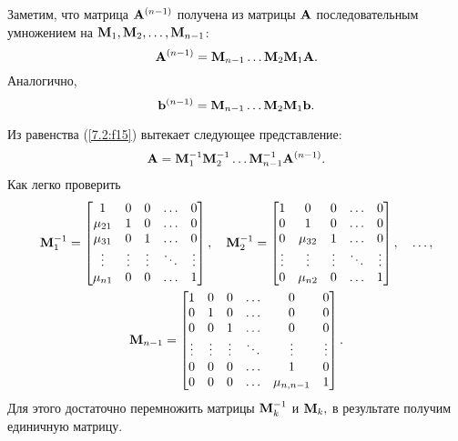 \documentclass[12pt]{article}
\begin{document}
    Заметим, что матрица $\bold{A}^{\left(n-1\right)}$ получена из матрицы $\bold{A}$ последовательным умножением на $\bold{M}_1, \bold{M}_2, \ldots, \bold{M}_{n-1}$:
    \begin{equation}
        \bold{A}^{\left(n-1\right)}=\bold{M}_{n-1}\ldots\bold{M}_2\bold{M}_1\bold{A}.
        \label{7.2:f15}
    \end{equation}
    Аналогично,
    \begin{equation}
        \bold{b}^{\left(n-1\right)}=\bold{M}_{n-1}\ldots\bold{M}_2\bold{M}_1\bold{b}.
    \end{equation}

    Из равенства (\ref{7.2:f15}) вытекает следующее представление:
    \begin{equation}
        \bold{A} = \bold{M}_1^{-1}\bold{M}_2^{-1}\ldots\bold{M}_{n-1}^{-1}\bold{A}^{\left(n-1\right)}.
        \label{7.2:f17}
    \end{equation}
    Как легко проверить
    \begin{equation}
        \begin{gathered}
            \bold{M}_1^{-1}=\begin{bmatrix}
                1 & 0 & 0 & \ldots & 0 \\
                \mu_{21} & 1 & 0 & \ldots & 0 \\
                \mu_{31} & 0 & 1 & \ldots & 0 \\
                \vdots & \vdots & \vdots & \ddots & \vdots \\
                \mu_{n1} & 0 & 0 & \ldots & 1
            \end{bmatrix},\quad
            \bold{M}_2^{-1}=
            \begin{bmatrix}
                1 & 0 & 0 & \ldots & 0 \\
                0 & 1 & 0 & \ldots & 0 \\
                0 & \mu_{32} & 1 & \ldots & 0 \\
                 \vdots & \vdots & \vdots & \ddots & \vdots \\
                 0 & \mu_{n2} & 0 & \ldots & 1
            \end{bmatrix},\quad\ldots,\\
            \bold{M}_{n-1}=
            \begin{bmatrix}
                1 & 0 & 0 & \ldots & 0 & 0 \\
                0 & 1 & 0 & \ldots & 0 & 0 \\
                0 & 0 & 1 & \ldots & 0 & 0 \\
                 \vdots & \vdots & \vdots & \ddots & \vdots &  \vdots \\
                 0 & 0 & 0 & \ldots & 1 & 0 \\
                 0 & 0 & 0 & \ldots & \mu_{n,n-1} & 1
            \end{bmatrix}.
        \end{gathered}
    \end{equation}
    Для этого достаточно перемножить матрицы $\bold{M}^{-1}_k$ и $\bold{M}_k,$ в результате получим единичную матрицу.
\end{document}
